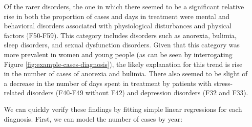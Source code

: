 \documentclass[
]{book}
\theoremstyle{definition}
\theoremstyle{definition}
\theoremstyle{definition}
\theoremstyle{definition}
\theoremstyle{remark}
\begin{document}
Of the rarer disorders, the one in which there seemed to be a significant relative rise in both the proportion of cases and days in treatment were mental and behavioral disorders associated with physiological disturbances and physical factors (F50-F59). This category includes disorders such as anorexia, bulimia, sleep disorders, and sexual dysfunction disorders. Given that this category was more prevalent in women and young people (as can be seen by interrogating Figure \ref{fig:example-cases-diagnosis}), the likely explanation for this trend is rise in the number of cases of anorexia and bulimia. There also seemed to be slight of a decrease in the number of days spent in treatment by patients with stress-related disorders (F40-F49 without F42) and depression disorders (F32 and F33).

We can quickly verify these findings by fitting simple linear regressions for each diagnosis. First, we can model the number of cases by year:
\end{document}
